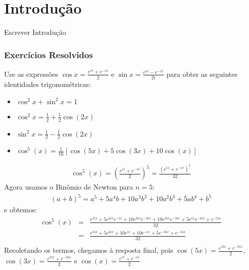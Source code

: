 
\chapter{Introdução}\label{chap:introducao}

Escrever Introdução

\subsection*{Exercícios Resolvidos}
\begin{exeresol}Use as expressões $\cos x=\frac{e^{ix}+e^{-ix}}{2}$ e $\sin x=\frac{e^{ix}-e^{-ix}}{2i}$ para obter as seguintes identidades trigonométricas:
\begin{itemize}
\item $\cos^2x+\sin^2x=1$
\item $\cos^2x=\frac{1}{2}+\frac{1}{2}\cos(2x)$
\item $\sin^2x=\frac{1}{2}-\frac{1}{2}\cos(2x)$
\item $\cos^5(x)=\frac{1}{16}\left[\cos(5x)+5\cos(3x)+10\cos(x)\right]$
\end{itemize}
\end{exeresol}
\begin{resol}
\begin{eqnarray*}
\cos^5(x)=\left(\frac{e^{ix}+e^{-ix}}{2}\right)^5=\frac{\left({e^{ix}+e^{-ix}}\right)^5}{32}
\end{eqnarray*}
Agora usamos o Binômio de Newton para $n=5$:
\begin{eqnarray*}
(a+b)^5=a^5+5a^4b+10a^3b^2+10a^2b^3+5ab^4+b^5
\end{eqnarray*}
e obtemos:
\begin{eqnarray*}
\cos^5(x)&=&\frac{{e^{5ix}+5e^{4ix}e^{-ix}+10e^{3ix}e^{-2ix}+10e^{2ix}e^{-3ix}+5e^{ix}e^{-4ix}+e^{-5ix}}}{32}\\
&=&\frac{{e^{5ix}+5e^{3ix}+10e^{ix}+10e^{-ix}+5e^{-3ix}+e^{-5ix}}}{32}\\
\end{eqnarray*}
Recoletando os termos, chegamos à resposta final, pois $\cos(5x)=\frac{e^{5ix}+e^{-5ix}}{2}$,$\cos(3x)=\frac{e^{3ix}+e^{-3ix}}{2}$ e $\cos(x)=\frac{e^{ix}+e^{-ix}}{2}$
\end{resol}

